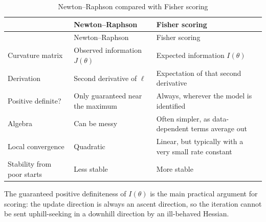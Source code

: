 \documentclass[
  letterpaper,
  DIV=11,
  numbers=noendperiod]{scrreprt}
\begin{document}
\begin{longtable}[]{@{}
  >{\raggedright\arraybackslash}p{}
  >{\raggedright\arraybackslash}p{}
  >{\raggedright\arraybackslash}p{}@{}}
\caption{Newton--Raphson compared with Fisher
scoring}\label{tbl-nr-scoring}\tabularnewline
\toprule\noalign{}
\begin{minipage}[b]{\linewidth}\raggedright
\end{minipage} & \begin{minipage}[b]{\linewidth}\raggedright
Newton--Raphson
\end{minipage} & \begin{minipage}[b]{\linewidth}\raggedright
Fisher scoring
\end{minipage} \\
\midrule\noalign{}
\endfirsthead
\toprule\noalign{}
\begin{minipage}[b]{\linewidth}\raggedright
\end{minipage} & \begin{minipage}[b]{\linewidth}\raggedright
Newton--Raphson
\end{minipage} & \begin{minipage}[b]{\linewidth}\raggedright
Fisher scoring
\end{minipage} \\
\midrule\noalign{}
\endhead
\bottomrule\noalign{}
\endlastfoot
Curvature matrix & Observed information \(J(\theta)\) & Expected
information \(I(\theta)\) \\
Derivation & Second derivative of \(\ell\) & Expectation of that second
derivative \\
Positive definite? & Only guaranteed near the maximum & Always, wherever
the model is identified \\
Algebra & Can be messy & Often simpler, as data-dependent terms average
out \\
Local convergence & Quadratic & Linear, but typically with a very small
rate constant \\
Stability from poor starts & Less stable & More stable \\
\end{longtable}

The guaranteed positive definiteness of \(I(\theta)\) is the main
practical argument for scoring: the update direction is always an ascent
direction, so the iteration cannot be sent uphill-seeking in a downhill
direction by an ill-behaved Hessian.
\end{document}
